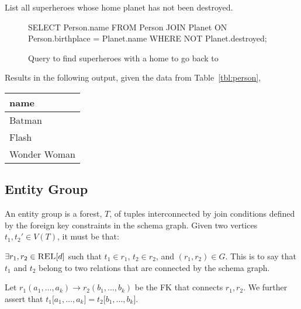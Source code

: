 		\begin{ex}
			List all superheroes whose home planet has not been destroyed.
			
			\begin{figure}[!ht]
				\begin{singlespaced}
					\begin{sqlcode}
SELECT Person.name
FROM   Person
       JOIN Planet
         ON Person.birthplace = Planet.name
WHERE  NOT Planet.destroyed;
					\end{sqlcode}
				\end{singlespaced}
				
				\caption{Query to find superheroes with a home to go back to}
			\end{figure}
			
			Results in the following output, given the data from Table~\ref{tbl:person},
			
			\begin{table}[!ht]
				\centering
				
				\begin{tabular}{l}
					\toprule
					name \\
					\midrule
					Batman \\
					Flash \\
					Wonder Woman \\
					\bottomrule
				\end{tabular}
			\end{table}
		\end{ex}
		
	\subsection{Entity Group}
		\begin{defn}
			An entity group is a forest, $T$,  of tuples interconnected by join conditions defined by the foreign key constraints in the schema graph.  Given two vertices $t_1, t_2'\in V\left(T\right)$, it must be that:

			$\exists r_1, r_2\in \textsc{REL}\lbrack d\rbrack$ such that $t_1 \in r_1$, $t_2\in r_2$, and $\left(r_1, r_2\right)\in G$.  This is to say that $t_1$ and $t_2$ belong to two relations that are connected by the schema graph.

			Let $r_1\left(a_1, \dotsc, a_k\right) \to r_2\left(b_1, \dotsc, b_k\right)$ be the FK that connects $r_1, r_2$.  We further assert that $t_1\lbrack a_1, \dotsc, a_k\rbrack = t_2\lbrack b_1, \dotsc, b_k\rbrack$.
		\end{defn}
		
